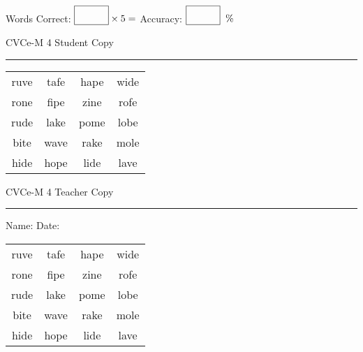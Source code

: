 \documentclass{memoir}
\begin{document}
\small

Words Correct: $\fbox{\phantom{\huge 100}} \times 5 = $ Accuracy: $\fbox{\phantom{\huge 100}}\;\; \%$ 

\vfill

\newpage


\footnotesize \noindent
CVCe-M 4 \hfill Student Copy
\smallskip
\hrule

\Large

\setlength{\tabcolsep}{14pt}
\def\arraystretch{2}

{\selectfont


\begin{vplace}[0.5]
\begin{center}
\begin{tabular}{cccc}
ruve & tafe & hape & wide \\
rone & fipe & zine & rofe \\
rude & lake & pome & lobe \\
bite & wave & rake & mole \\
hide & hope & lide & lave \\
\end{tabular}
\end{center}
\end{vplace}

}

\newpage

\footnotesize \noindent
CVCe-M 4 \hfill Teacher Copy
\smallskip
\hrule

\small

\vfill

\noindent
Name: \underline{\hspace{1.75in}} \hfill Date: \underline{\hspace{1in}}

\Large

{\selectfont


\begin{vplace}[0.5]
\begin{center}
\begin{tabular}{cccc}
ruve & tafe & hape & wide \\
rone & fipe & zine & rofe \\
rude & lake & pome & lobe \\
bite & wave & rake & mole \\
hide & hope & lide & lave \\
\end{tabular}
\end{center}
\end{vplace}



}
\end{document}
